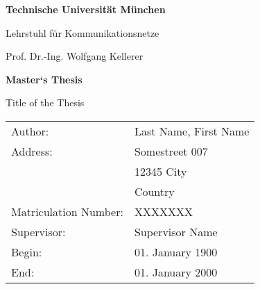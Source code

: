 \documentclass[12pt, a4paper, twoside, openright]{report}
\begin{document}
\thispagestyle{empty}
\newpage

\vspace{5cm}
\begin{center}
    \epsfxsize=4cm
\end{center}

\parbox{15cm}{\begin{center} {\sf\bf 
                               \Large  Technische Universität München
                                \smallskip

                               \Large Lehrstuhl für Kommunikationsnetze
                               \smallskip
                              }

                              {\sf \large Prof. Dr.-Ing. Wolfgang Kellerer} 
              \end{center}}  %

\vspace{4cm}

\begin{center}
        {\bf\Huge Master‘s Thesis} %
\end{center}

\begin{center}
        \settowidth{\baselineskip}{0.4cm}
        {\LARGE 
        Title of the Thesis
        }
\end{center}

\vfill         
{\settowidth{\baselineskip}{0.2cm}
\large\begin{tabular}[l]{ll}
Author: & Last Name, First Name\\
Address: & Somestreet 007\\
         & 12345 City\\
         & Country\\
Matriculation Number: & XXXXXXX\\
Supervisor: & Supervisor Name\\
Begin: & 01. January 1900\\
End: & 01. January 2000
\end{tabular}}


\setcounter{pageno}{1} %
\addtocounter{pageno}{1}

%

\end{document}
